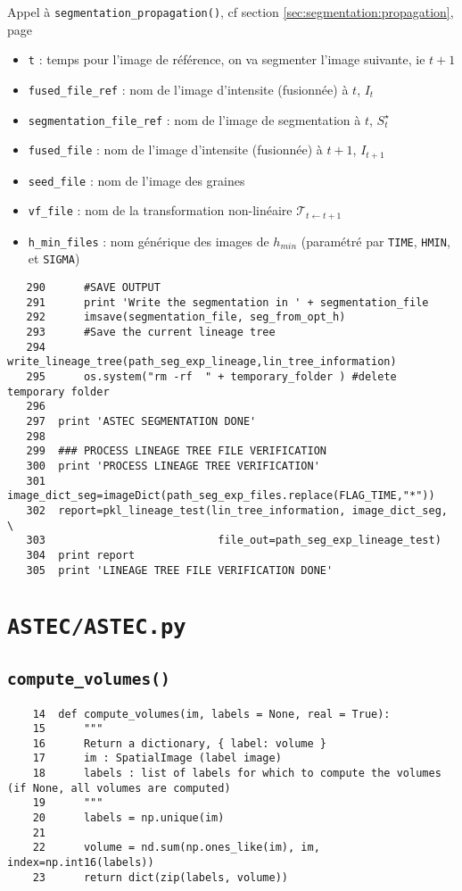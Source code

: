 \documentclass{article}
\def \mycolor {red}
\begin{document}
\color{\mycolor}
Appel \`a \texttt{segmentation\_propagation()}, cf section \ref{sec:segmentation:propagation}, page \pageref{sec:segmentation:propagation}
\begin{itemize}
\itemsep -1ex
\item \verb|t| : temps pour l'image de r\'ef\'erence, on va segmenter l'image suivante, ie $t+1$
\item \verb|fused_file_ref| : nom de l'image d'intensite (fusionn\'ee) \`a $t$, $I_t$
\item \verb|segmentation_file_ref| : nom de l'image de segmentation \`a $t$, $S^{\star}_t$
\item \verb|fused_file| : nom de l'image d'intensite (fusionn\'ee) \`a $t+1$, $I_{t+1}$
\item \verb|seed_file| : nom de l'image des graines
\item \verb|vf_file| : nom de la  transformation non-lin\'eaire $\mathcal{T}_{t \leftarrow t+1}$
\item \verb|h_min_files| : nom g\'en\'erique des images de $h_{min}$ (param\'etr\'e par \verb|TIME|, \verb|HMIN|, et \verb|SIGMA|)
\end{itemize}
\color{black}
\begin{verbatim} 
   290	    #SAVE OUTPUT
   291	    print 'Write the segmentation in ' + segmentation_file
   292	    imsave(segmentation_file, seg_from_opt_h)
   293	    #Save the current lineage tree
   294	    write_lineage_tree(path_seg_exp_lineage,lin_tree_information) 
   295	    os.system("rm -rf  " + temporary_folder ) #delete temporary folder
   296	
   297	print 'ASTEC SEGMENTATION DONE'
   298	
   299	### PROCESS LINEAGE TREE FILE VERIFICATION
   300	print 'PROCESS LINEAGE TREE VERIFICATION'
   301	image_dict_seg=imageDict(path_seg_exp_files.replace(FLAG_TIME,"*"))
   302	report=pkl_lineage_test(lin_tree_information, image_dict_seg, \
   303	                         file_out=path_seg_exp_lineage_test)
   304	print report
   305	print 'LINEAGE TREE FILE VERIFICATION DONE'
\end{verbatim}





\section{\texttt{ASTEC/ASTEC.py}}

\subsection{\texttt{compute\_volumes()}}
\begin{verbatim}
    14	def compute_volumes(im, labels = None, real = True):
    15	    """
    16	    Return a dictionary, { label: volume }
    17	    im : SpatialImage (label image)
    18	    labels : list of labels for which to compute the volumes (if None, all volumes are computed)
    19	    """
    20	    labels = np.unique(im)
    21	
    22	    volume = nd.sum(np.ones_like(im), im, index=np.int16(labels))
    23	    return dict(zip(labels, volume))
\end{verbatim}
\end{document}

